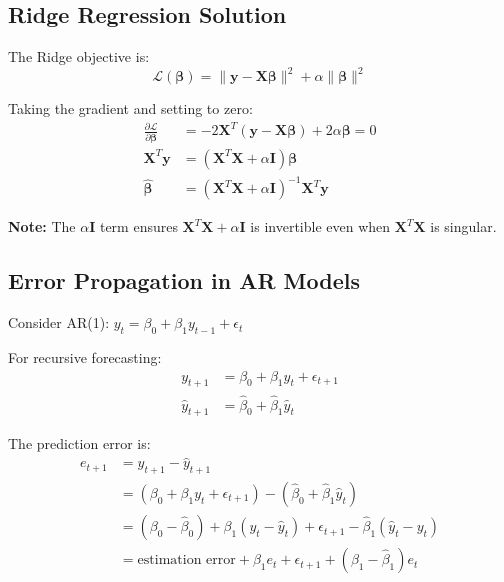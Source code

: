 \documentclass[12pt,a4paper]{article}
\begin{document}
\subsection{Ridge Regression Solution}

The Ridge objective is:
\begin{equation}
\mathcal{L}(\boldsymbol{\beta}) = \|\mathbf{y} - \mathbf{X}\boldsymbol{\beta}\|^2 + \alpha\|\boldsymbol{\beta}\|^2
\end{equation}

Taking the gradient and setting to zero:
\begin{align}
\frac{\partial \mathcal{L}}{\partial \boldsymbol{\beta}} &= -2\mathbf{X}^T(\mathbf{y} - \mathbf{X}\boldsymbol{\beta}) + 2\alpha\boldsymbol{\beta} = 0 \\
\mathbf{X}^T\mathbf{y} &= (\mathbf{X}^T\mathbf{X} + \alpha\mathbf{I})\boldsymbol{\beta} \\
\hat{\boldsymbol{\beta}} &= (\mathbf{X}^T\mathbf{X} + \alpha\mathbf{I})^{-1}\mathbf{X}^T\mathbf{y}
\end{align}

\textbf{Note:} The $\alpha\mathbf{I}$ term ensures $\mathbf{X}^T\mathbf{X} + \alpha\mathbf{I}$ is invertible even when $\mathbf{X}^T\mathbf{X}$ is singular.

\subsection{Error Propagation in AR Models}

Consider AR(1): $y_t = \beta_0 + \beta_1 y_{t-1} + \epsilon_t$

For recursive forecasting:
\begin{align}
y_{t+1} &= \beta_0 + \beta_1 y_t + \epsilon_{t+1} \\
\hat{y}_{t+1} &= \hat{\beta}_0 + \hat{\beta}_1 \hat{y}_t
\end{align}

The prediction error is:
\begin{align}
e_{t+1} &= y_{t+1} - \hat{y}_{t+1} \\
&= (\beta_0 + \beta_1 y_t + \epsilon_{t+1}) - (\hat{\beta}_0 + \hat{\beta}_1 \hat{y}_t) \\
&= (\beta_0 - \hat{\beta}_0) + \beta_1(y_t - \hat{y}_t) + \epsilon_{t+1} - \hat{\beta}_1(\hat{y}_t - y_t) \\
&= \text{estimation error} + \beta_1 e_t + \epsilon_{t+1} + (\beta_1 - \hat{\beta}_1)e_t
\end{align}
\end{document}
